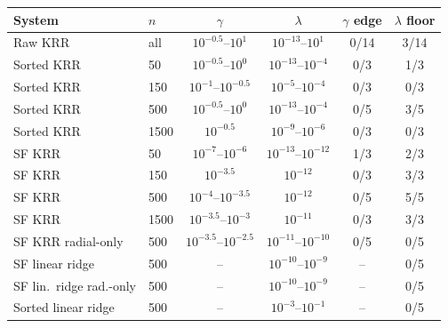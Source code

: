 \begin{tabular}{llcccc}
\toprule
System & $n$ & $\gamma$ & $\lambda$ & $\gamma$ edge & $\lambda$ floor \\
\midrule
Raw KRR & all & $10^{-0.5}$--$10^{1}$ & $10^{-13}$--$10^{1}$ & 0/14 & 3/14 \\
Sorted KRR & 50 & $10^{-0.5}$--$10^{0}$ & $10^{-13}$--$10^{-4}$ & 0/3 & 1/3 \\
Sorted KRR & 150 & $10^{-1}$--$10^{-0.5}$ & $10^{-5}$--$10^{-4}$ & 0/3 & 0/3 \\
Sorted KRR & 500 & $10^{-0.5}$--$10^{0}$ & $10^{-13}$--$10^{-4}$ & 0/5 & 3/5 \\
Sorted KRR & 1500 & $10^{-0.5}$ & $10^{-9}$--$10^{-6}$ & 0/3 & 0/3 \\
SF KRR & 50 & $10^{-7}$--$10^{-6}$ & $10^{-13}$--$10^{-12}$ & 1/3 & 2/3 \\
SF KRR & 150 & $10^{-3.5}$ & $10^{-12}$ & 0/3 & 3/3 \\
SF KRR & 500 & $10^{-4}$--$10^{-3.5}$ & $10^{-12}$ & 0/5 & 5/5 \\
SF KRR & 1500 & $10^{-3.5}$--$10^{-3}$ & $10^{-11}$ & 0/3 & 3/3 \\
SF KRR radial-only & 500 & $10^{-3.5}$--$10^{-2.5}$ & $10^{-11}$--$10^{-10}$ & 0/5 & 0/5 \\
SF linear ridge & 500 & -- & $10^{-10}$--$10^{-9}$ & -- & 0/5 \\
SF lin.\ ridge rad.-only & 500 & -- & $10^{-10}$--$10^{-9}$ & -- & 0/5 \\
Sorted linear ridge & 500 & -- & $10^{-3}$--$10^{-1}$ & -- & 0/5 \\
\bottomrule
\end{tabular}